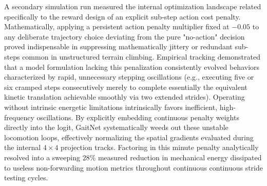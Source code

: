 A secondary simulation run measured the internal optimization landscape related specifically to the reward design of an explicit sub-step action cost penalty. Mathematically, applying a persistent action penalty multiplier fixed at $-0.05$ to any deliberate trajectory choice deviating from the pure "no-action" decision proved indispensable in suppressing mathematically jittery or redundant sub-steps common in unstructured terrain climbing. Empirical tracking demonstrated that a model formulation lacking this penalization consistently evolved behaviors characterized by rapid, unnecessary stepping oscillations (e.g., executing five or six cramped steps consecutively merely to complete essentially the equivalent kinetic translation achievable smoothly via two extended strides). Operating without intrinsic energetic limitations intrinsically favors inefficient, high-frequency oscillations. By explicitly embedding continuous penalty weights directly into the logit, GaitNet systematically weeds out these unstable locomotion loops, effectively normalizing the spatial gradients evaluated during the internal $4 \times 4$ projection tracks. Factoring in this minute penalty analytically resolved into a sweeping $28\%$ measured reduction in mechanical energy dissipated to useless non-forwarding motion metrics throughout continuous continuous stride testing cycles.
